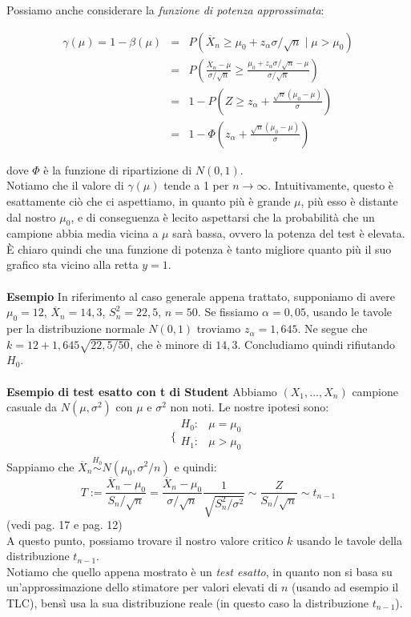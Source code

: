 Possiamo anche considerare la \textit{funzione di potenza approssimata}:

\begin{eqnarray}
\gamma(\mu) = 1- \beta(\mu) 	&=& P(\overline{X}_n \geq \mu_0 + z_{\alpha} \sigma / \sqrt{n} \mid \mu > \mu_0) \nonumber \\
							&=& P \left(\frac{\overline{X}_n-\mu}{\sigma / \sqrt{n}} \geq \frac{\mu_0 + z_{\alpha} \sigma / \sqrt{n} - \mu}{\sigma / \sqrt{n}} \right) \nonumber \\
							&=& 1-P \left( Z \geq z_{\alpha} + \frac{\sqrt{n}(\mu_0 - \mu)}{\sigma} \right) \nonumber \\
							&=& 1-\Phi \left( z_{\alpha} + \frac{\sqrt{n}(\mu_0 - \mu)}{\sigma} \right) \nonumber
\end{eqnarray}

dove $\Phi$ è la funzione di ripartizione di $N(0,1)$.\\
Notiamo che il valore di $\gamma(\mu)$ tende a 1 per $n \rightarrow \infty$. Intuitivamente, questo è esattamente ciò che ci aspettiamo, in quanto più è grande $\mu$, più esso è distante dal nostro $\mu_0$, e di conseguenza è lecito aspettarsi che la probabilità che un campione abbia media vicina a $\mu$ sarà bassa, ovvero la potenza del test è elevata.\\
È chiaro quindi che una funzione di potenza è tanto migliore quanto più il suo grafico sta vicino alla retta $y=1$.\\
\\
\textbf{Esempio} In riferimento al caso generale appena trattato, supponiamo di avere $\mu_0=12$, $\overline{X}_n=14,3$, $S_n^2=22,5$, $n=50$. Se fissiamo $\alpha=0,05$, usando le tavole per la distribuzione normale $N(0,1)$ troviamo $z_{\alpha}=1,645$. Ne segue che $k=12+1,645\sqrt{22,5/50}$, che è minore di $14,3$. Concludiamo quindi rifiutando $H_0$.\\
\\
\textbf{Esempio di test esatto con t di Student} Abbiamo $(X_1,...,X_n)$ campione casuale da $N(\mu,\sigma^2)$ con $\mu$ e $\sigma^2$ non noti. Le nostre ipotesi sono:
$$\bigg \{
\begin{array}{rl}
H_0: & \mu=\mu_0 \\
H_1: & \mu>\mu_0 \\
\end{array}
$$
Sappiamo che $\overline{X}_n \stackrel{H_0}{\sim} N(\mu_0,\sigma^2/n)$ e quindi:
$$T:= \frac{\overline{X}_n - \mu_0}{S_n / \sqrt{n}} = \frac{\overline{X}_n - \mu_0}{\sigma / \sqrt{n}} \frac{1}{\sqrt{S_n^2 / \sigma^2}} \sim \frac{Z}{S_n / \sqrt{n}} \sim t_{n-1}$$
(vedi pag. 17 e pag. 12)\\
A questo punto, possiamo trovare il nostro valore critico $k$ usando le tavole della distribuzione $t_{n-1}$.\\
Notiamo che quello appena mostrato è un \textit{test esatto}, in quanto non si basa su un'approssimazione dello stimatore per valori elevati di $n$ (usando ad esempio il TLC), bensì usa la sua distribuzione reale (in questo caso la distribuzione $t_{n-1}$).
